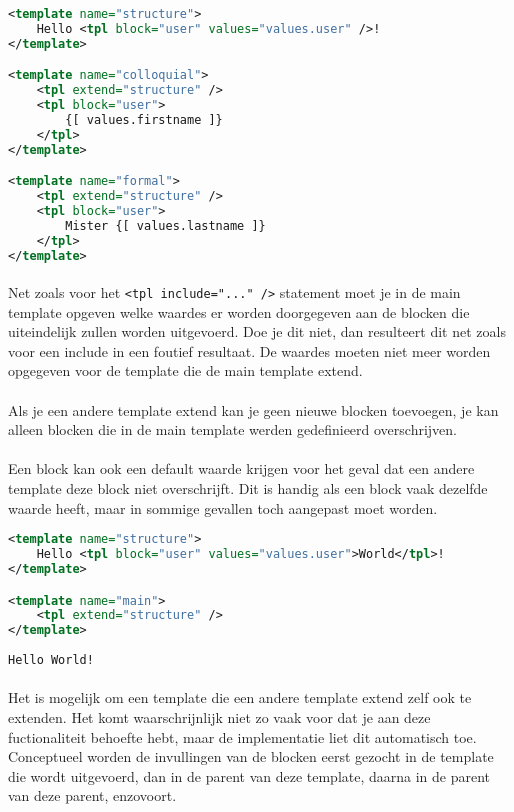 \begin{lstlisting}[language=xml]
<template name="structure">
	Hello <tpl block="user" values="values.user" />!
</template>

<template name="colloquial">
	<tpl extend="structure" />
	<tpl block="user">
		{[ values.firstname ]}
	</tpl>
</template>

<template name="formal">
	<tpl extend="structure" />
	<tpl block="user">
		Mister {[ values.lastname ]}
	</tpl>
</template>
\end{lstlisting}

\paragraph {} Net zoals voor het \lstinline{<tpl include="..." />} statement moet je in de
main template opgeven welke waardes er worden doorgegeven aan de blocken die uiteindelijk
zullen worden uitgevoerd. Doe je dit niet, dan resulteert dit net zoals voor een include
in een foutief resultaat. De waardes moeten niet meer worden opgegeven voor de template
die de main template extend.

\paragraph {} Als je een andere template extend kan je geen nieuwe blocken toevoegen, je
kan alleen blocken die in de main template werden gedefinieerd overschrijven.

\paragraph {} Een block kan ook een default waarde krijgen voor het geval dat een andere
template deze block niet overschrijft. Dit is handig als een block vaak dezelfde waarde
heeft, maar in sommige gevallen toch aangepast moet worden.

\begin{lstlisting}[language=xml]
<template name="structure">
	Hello <tpl block="user" values="values.user">World</tpl>!
</template>

<template name="main">
	<tpl extend="structure" />
</template>
\end{lstlisting}

\begin{lstlisting}
Hello World!
\end{lstlisting}

\paragraph {} Het is mogelijk om een template die een andere template extend zelf ook te
extenden. Het komt waarschrijnlijk niet zo vaak voor dat je aan deze fuctionaliteit
behoefte hebt, maar de implementatie liet dit automatisch toe. Conceptueel worden de
invullingen van de blocken eerst gezocht in de template die wordt uitgevoerd, dan in de
parent van deze template, daarna in de parent van deze parent, enzovoort.

